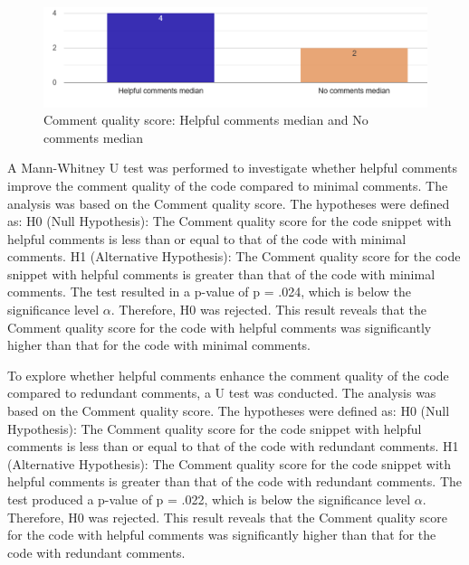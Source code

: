 \begin{figure} [H]
  \centering
  \includegraphics[scale=0.6]{figures/h-0-q4.png}
  \caption{Comment quality score: Helpful comments median and No comments median}
  \label{fig:AnhangsChor}
\end{figure}


A Mann-Whitney U test was performed to investigate whether helpful comments improve the comment quality of the code compared to minimal comments. The analysis was based on the Comment quality score. The hypotheses were defined as: H0 (Null Hypothesis): The Comment quality score for the code snippet with helpful comments is less than or equal to that of the code with minimal comments.  H1 (Alternative Hypothesis): The Comment quality score for the code snippet with helpful comments is greater than that of the code with minimal comments. The test resulted in a p-value of p = .024, which is below the significance level $\alpha $. Therefore, H0 was rejected. This result reveals that the Comment quality score for the code with helpful comments was significantly higher than that for the code with minimal comments.





To explore whether helpful comments enhance the comment quality of the code compared to redundant comments, a  U test was conducted.  The analysis was based on the Comment quality score. The hypotheses were defined as: H0 (Null Hypothesis): The Comment quality score for the code snippet with helpful comments is less than or equal to that of the code with redundant comments.  H1 (Alternative Hypothesis): The Comment quality score for the code snippet with helpful comments is greater than that of the code with redundant comments. The test produced a p-value of p = .022, which is below the significance level $\alpha $. Therefore, H0 was rejected. This result reveals that the Comment quality score for the code with helpful comments was significantly higher than that for the code with redundant comments. 



